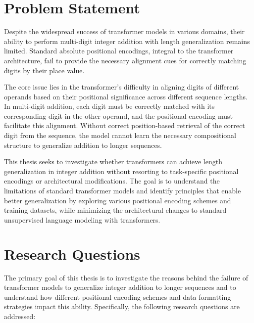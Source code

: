 \section{Problem Statement}

Despite the widespread success of transformer models in various domains, their ability to perform multi-digit integer addition with length generalization remains limited. Standard absolute positional encodings, integral to the transformer architecture, fail to provide the necessary alignment cues for correctly matching digits by their place value.

The core issue lies in the transformer's difficulty in aligning digits of different operands based on their positional significance across different sequence lengths. In multi-digit addition, each digit must be correctly matched with its corresponding digit in the other operand, and the positional encoding must facilitate this alignment. Without correct position-based retrieval of the correct digit from the sequence, the model cannot learn the necessary compositional structure to generalize addition to longer sequences.

This thesis seeks to investigate whether transformers can achieve length generalization in integer addition without resorting to task-specific positional encodings or architectural modifications. The goal is to understand the limitations of standard transformer models and identify principles that enable better generalization by exploring various positional encoding schemes and training datasets, while minimizing the architectural changes to standard unsupervised language modeling with transformers.

\section{Research Questions}

The primary goal of this thesis is to investigate the reasons behind the failure of transformer models to generalize integer addition to longer sequences and to understand how different positional encoding schemes and data formatting strategies impact this ability. Specifically, the following research questions are addressed:

